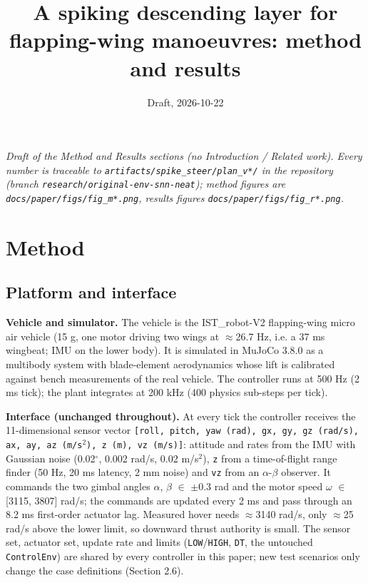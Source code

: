 \documentclass[10pt,a4paper]{article}
\title{A spiking descending layer for flapping-wing manoeuvres: method and results}
\author{}
\date{Draft, 2026-10-22}
\begin{document}
\maketitle

\noindent\emph{Draft of the Method and Results sections (no Introduction / Related work). Every number is traceable to \texttt{artifacts/spike\_steer/plan\_v*/} in the repository (branch \texttt{research/original-env-snn-neat}); method figures are \texttt{docs/paper/figs/fig\_m*.png}, results figures \texttt{docs/paper/figs/fig\_r*.png}.}


\section{Method}

\subsection{Platform and interface}

\textbf{Vehicle and simulator.} The vehicle is the IST\_robot-V2 flapping-wing micro air vehicle (15 g, one motor driving two wings at $\approx$26.7 Hz, i.e. a 37 ms wingbeat; IMU on the lower body). It is simulated in MuJoCo 3.8.0 as a multibody system with blade-element aerodynamics whose lift is calibrated against bench measurements of the real vehicle. The controller runs at 500 Hz (2 ms tick); the plant integrates at 200 kHz (400 physics sub-steps per tick).

\textbf{Interface (unchanged throughout).} At every tick the controller receives the 11-dimensional sensor vector \texttt{[roll, pitch, yaw (rad), gx, gy, gz (rad/s), ax, ay, az (m/s$^{2}$), z (m), vz (m/s)]}: attitude and rates from the IMU with Gaussian noise (0.02$^\circ$, 0.002 rad/s, 0.02 m/s$^{2}$), \texttt{z} from a time-of-flight range finder (50 Hz, 20 ms latency, 2 mm noise) and \texttt{vz} from an $\alpha$-$\beta$ observer. It commands the two gimbal angles $\alpha$, $\beta$ $\in$ $\pm$0.3 rad and the motor speed $\omega$ $\in$ [3115, 3807] rad/s; the commands are updated every 2 ms and pass through an 8.2 ms first-order actuator lag. Measured hover needs $\approx$3140 rad/s, only $\approx$25 rad/s above the lower limit, so downward thrust authority is small. The sensor set, actuator set, update rate and limits (\texttt{LOW}/\texttt{HIGH}, \texttt{DT}, the untouched \texttt{ControlEnv}) are shared by every controller in this paper; new test scenarios only change the case definitions (Section 2.6).
\end{document}
